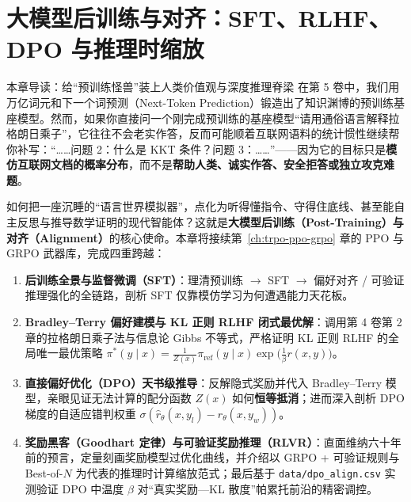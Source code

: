 \chapter[大模型后训练：SFT、RLHF、DPO 与 RLVR]{大模型后训练与对齐：SFT、RLHF、DPO 与推理时缩放}
\label{ch:posttrain-rlhf-dpo}


\begin{chapIntro}{本章导读：给“预训练怪兽”装上人类价值观与深度推理脊梁}
在第 5 卷中，我们用万亿词元和下一个词预测（Next-Token Prediction）锻造出了知识渊博的预训练基座模型。然而，如果你直接问一个刚完成预训练的基座模型“请用通俗语言解释拉格朗日乘子”，它往往不会老实作答，反而可能顺着互联网语料的统计惯性继续帮你补写：“……问题 2：什么是 KKT 条件？问题 3：……”——因为它的目标只是\textbf{模仿互联网文档的概率分布}，而不是\textbf{帮助人类、诚实作答、安全拒答或独立攻克难题}。

如何把一座沉睡的“语言世界模拟器”，点化为听得懂指令、守得住底线、甚至能自主反思与推导数学证明的现代智能体？这就是\textbf{大模型后训练（Post-Training）与对齐（Alignment）}的核心使命。本章将接续第~\ref{ch:trpo-ppo-grpo} 章的 PPO 与 GRPO 武器库，完成四重跨越：
\begin{enumerate}
  \item \textbf{后训练全景与监督微调（SFT）}：理清预训练 $\to$ SFT $\to$ 偏好对齐 / 可验证推理强化的全链路，剖析 SFT 仅靠模仿学习为何遭遇能力天花板。
  \item \textbf{Bradley--Terry 偏好建模与 KL 正则 RLHF 闭式最优解}：调用第 4 卷第 2 章的拉格朗日乘子法与信息论 Gibbs 不等式，严格证明 KL 正则 RLHF 的全局唯一最优策略 $\pi^*(y\mid x) = \frac{1}{Z(x)}\pi_{\mathrm{ref}}(y\mid x)\exp\big(\frac{1}{\beta}r(x,y)\big)$。
  \item \textbf{直接偏好优化（DPO）天书级推导}：反解隐式奖励并代入 Bradley--Terry 模型，亲眼见证无法计算的配分函数 $Z(x)$ 如何\textbf{恒等抵消}；进而深入剖析 DPO 梯度的自适应错判权重 $\sigma(\hat{r}_\theta(x, y_l) - \hat{r}_\theta(x, y_w))$。
  \item \textbf{奖励黑客（Goodhart 定律）与可验证奖励推理（RLVR）}：直面维纳六十年前的预言，定量刻画奖励模型过优化曲线，并介绍以 GRPO + 可验证规则与 Best-of-$N$ 为代表的推理时计算缩放范式；最后基于 \texttt{data/dpo\_align.csv} 实测验证 DPO 中温度 $\beta$ 对“真实奖励—KL 散度”帕累托前沿的精密调控。
\end{enumerate}
\end{chapIntro}

